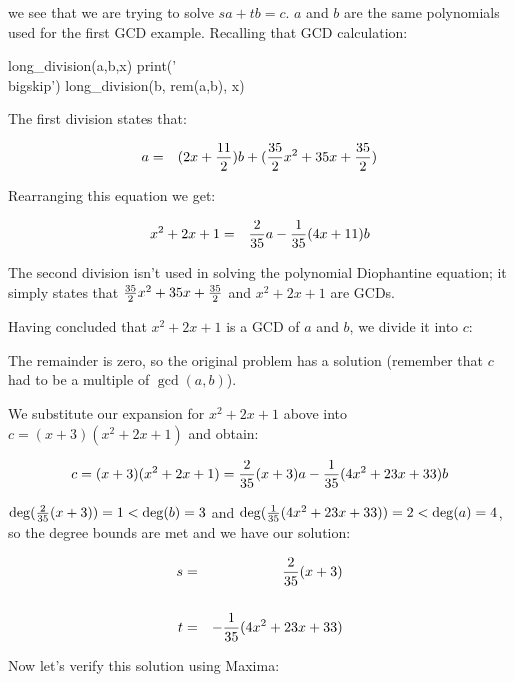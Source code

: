 we see that we are trying to solve $sa+tb=c$.
$a$ and $b$ are the same polynomials used for the first GCD example.
Recalling that GCD calculation:

\bigskip
\begin{sympycode}
long_division(a,b,x)
print('\\bigskip')
long_division(b, rem(a,b), x)
\end{sympycode}

The first division states that:

\begin{eqnarray*}
a &=& (2x+{11\over2})b + ({35\over2}x^2+35x+{35\over2})
\end{eqnarray*}

Rearranging this equation we get:

\begin{eqnarray*}
x^2+2x+1 &=& {2\over35}a - {1\over35}(4x+11)b \cr
\end{eqnarray*}

The second division isn't used in solving the polynomial
Diophantine equation; it simply states that
${35\over2}x^2+35x+{35\over2}$ and $x^2+2x+1$ are GCDs.

Having concluded that
$x^2+2x+1$ is a GCD of $a$ and $b$, we divide it into $c$:



The remainder is zero, so the original problem has a solution
(remember that $c$ had to be a multiple of $\gcd(a,b)$).

We substitute our expansion for $x^2+2x+1$ above into $c=(x+3)(x^2+2x+1)$
and obtain:


$$c = (x+3)(x^2+2x+1)
 = {2\over35}(x+3)a - {1\over35}(4x^2+23x+33)b $$

$\deg({2\over35}(x+3)) = 1 < \deg(b) = 3$ and $\deg({1\over35}(4x^2+23x+33))
= 2 < \deg(a) = 4$, so the degree bounds are met and we have our solution:

\begin{eqnarray*}
s &=& {2\over35}(x+3) \cr\cr
t &=& - {1\over35}(4x^2+23x+33) \cr
\end{eqnarray*}

Now let's verify this solution using Maxima:

